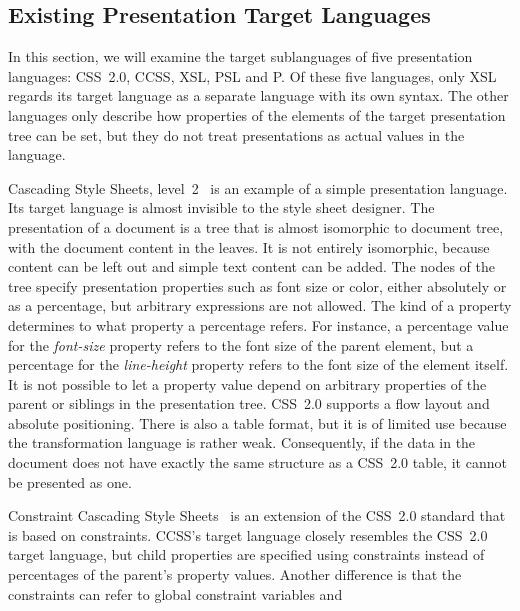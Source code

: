 \subsection{Existing Presentation Target Languages}
\label{existingtarget}
\par In this section, we will examine the target sublanguages of five
        presentation languages: CSS~2.0, CCSS, XSL, PSL and P. Of these five
        languages, only XSL regards its target language as a separate language with its
        own syntax. The other languages only describe how properties of the elements of
        the target presentation tree can be set, but they do not treat presentations as
        actual values in the language.
\par {} Cascading Style Sheets,
        level~2~\cite{css} is an example of a simple presentation
        language. Its target language is almost invisible to the style sheet designer.
        The presentation of a document is a tree that is almost isomorphic to document
        tree, with the document content in the leaves. It is not entirely isomorphic,
        because content can be left out and simple text content can be added. The nodes
        of the tree specify presentation properties such as font size or color, either
        absolutely or as a percentage, but arbitrary expressions are not allowed. The
        kind of a property determines to what property a percentage refers. For
        instance, a percentage value for the {\em font-size} property refers to the
        font size of the parent element, but a percentage for the {\em line-height}
        property refers to the font size of the element itself. It is not possible to
        let a property value depend on arbitrary properties of the parent or siblings
        in the presentation tree. CSS~2.0 supports a flow layout and absolute
        positioning. There is also a table format, but it is of limited use because the
        transformation language is rather weak. Consequently, if the data in the
        document does not have exactly the same structure as a CSS~2.0 table, it
        cannot be presented as one.
\par {} Constraint Cascading Style
        Sheets~\cite{ccss} is an extension of the CSS~2.0 standard
        that is based on constraints. CCSS's target language closely resembles the
        CSS~2.0 target language, but child properties are specified using
        constraints instead of percentages of the parent's property values. Another
        difference is that the constraints can refer to global constraint variables and
